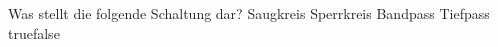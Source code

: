     {Was stellt die folgende Schaltung dar? }
    {Saugkreis}
    {Sperrkreis}
    {Bandpass}
    {Tiefpass}
    {true}{false}